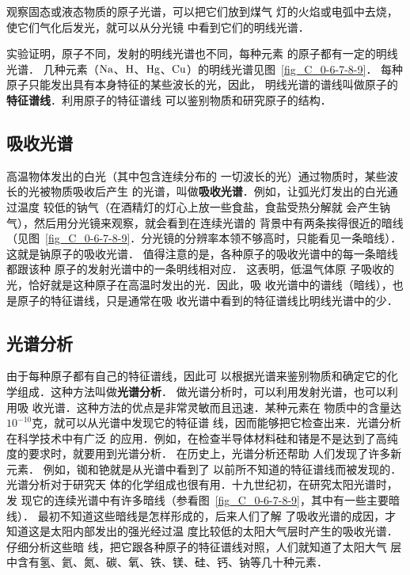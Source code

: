 观察固态或液态物质的原子光谱，可以把它们放到煤气
灯的火焰或电弧中去烧，使它们气化后发光，就可以从分光镜
中看到它们的明线光谱．

实验证明，原子不同，发射的明线光谱也不同，每种元素
的原子都有一定的明线光谱．
几种元素（$\rm{Na}$、$\rm{H}$、$\rm{Hg}$、$\rm{Cu}$）的明线光谱见图~\ref{fig_C_0-6-7-8-9}．
每种原子只能发出具有本身特征的某些波长的光，因此，
明线光谱的谱线叫做原子的\textbf{特征谱线}．利用原子的特征谱线
可以鉴别物质和研究原子的结构．

\subsection{吸收光谱}
高温物体发出的白光（其中包含连续分布的
一切波长的光）通过物质时，某些波长的光被物质吸收后产生
的光谱，叫做\textbf{吸收光谱}．例如，让弧光灯发出的白光通过温度
较低的钠气（在酒精灯的灯心上放一些食盐，食盐受热分解就
会产生钠气），然后用分光镜来观察，就会看到在连续光谱的
背景中有两条挨得很近的暗线（见图~\ref{fig_C_0-6-7-8-9}．分光镜的分辨率本领不够高时，只能看见一条暗线）．
这就是钠原子的吸收光谱．
值得注意的是，各种原子的吸收光谱中的每一条暗线都跟该种
原子的发射光谱中的一条明线相对应．
这表明，低温气体原
子吸收的光，恰好就是这种原子在高温时发出的光．因此，吸
收光谱中的谱线（暗线），也是原子的特征谱线，只是通常在吸
收光谱中看到的特征谱线比明线光谱中的少．

\subsection{光谱分析}

由于每种原子都有自己的特征谱线，因此可
以根据光谱来鉴别物质和确定它的化学组成．这种方法叫做\textbf{光谱分析}．
做光谱分析时，可以利用发射光谱，也可以利用吸
收光谱．这种方法的优点是非常灵敏而且迅速．某种元素在
物质中的含量达$10^{-10}$克，就可以从光谱中发现它的特征谱
线，因而能够把它检查出来．光谱分析在科学技术中有广泛
的应用．例如，在检查半导体材料硅和锗是不是达到了高纯
度的要求时，就要用到光谱分析．
在历史上，光谱分析还帮助
人们发现了许多新元素．
例如，铷和铯就是从光谱中看到了
以前所不知道的特征谱线而被发现的．光谱分析对于研究天
体的化学组成也很有用．十九世纪初，在研究太阳光谱时，发
现它的连续光谱中有许多暗线（参看图~\ref{fig_C_0-6-7-8-9}，其中有一些主要暗线）．
最初不知道这些暗线是怎样形成的，后来人们了解
了吸收光谱的成因，才知道这是太阳内部发出的强光经过温
度比较低的太阳大气层时产生的吸收光谱．仔细分析这些暗
线，把它跟各种原子的特征谱线对照，人们就知道了太阳大气
层中含有氢、氦、氮、碳、氧、铁、镁、硅、钙、钠等几十种元素．

